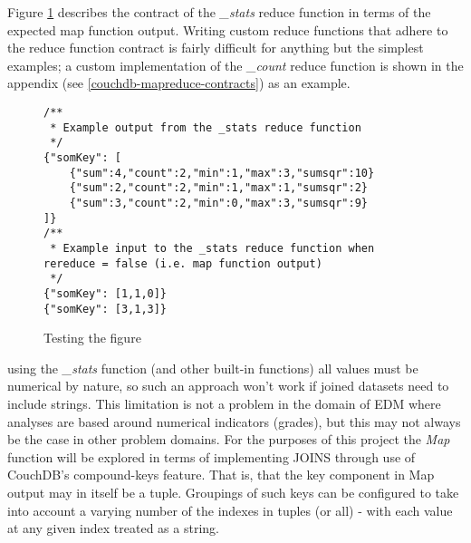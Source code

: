 Figure \ref{stats-reduce-fn} describes the contract of the \textit{\_stats} reduce function in terms of the expected map function output. Writing custom reduce functions that adhere to the reduce function contract is fairly difficult for anything but the simplest examples; a custom implementation of the \textit{\_count} reduce function is shown in the appendix (see \ref{couchdb-mapreduce-contracts}) as an example.


\begin{figure}[ht]
    \begin{verbatim}
/**
 * Example output from the _stats reduce function
 */
{"somKey": [
    {"sum":4,"count":2,"min":1,"max":3,"sumsqr":10}
    {"sum":2,"count":2,"min":1,"max":1,"sumsqr":2}
    {"sum":3,"count":2,"min":0,"max":3,"sumsqr":9}
]}
/**
 * Example input to the _stats reduce function when rereduce = false (i.e. map function output)
 */
{"somKey": [1,1,0]}
{"somKey": [3,1,3]}
\end{verbatim}
    \caption{Testing the figure}
    \label{stats-reduce-fn}
\end{figure}


using the \textit{\_stats} function (and other built-in functions) all values must be numerical by nature, so such an approach won't work if joined datasets need to include strings. This limitation is not a problem in the domain of EDM where analyses are based around numerical indicators (grades), but this may not always be the case in other problem domains. For the purposes of this project the \textit{Map} function will be explored in terms of implementing JOINS through use of CouchDB's compound-keys feature. That is, that the key component in Map output may in itself be a tuple. Groupings of such keys can be configured to take into account a varying number of the indexes in tuples (or all) - with each value at any given index treated as a string.

